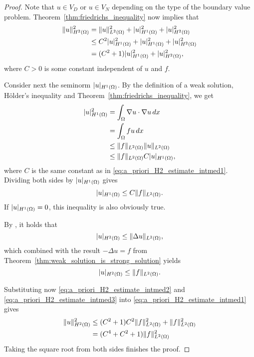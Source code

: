 \documentclass[english, 12pt, a4paper, sci, utf8, a-2b, online]{aaltothesis}
\theoremstyle{definition}
\theoremstyle{plain}
\DeclarePairedDelimiter\abs{\lvert}{\rvert}
\DeclarePairedDelimiter\norm{\lVert}{\rVert}
\newcommand*\diff{\mathop{}\!d}
\numberwithin{equation}{section}
\begin{document}
\begin{proof}
    Note that $u \in V_D$ or $u \in V_N$ depending
    on the type of the boundary value problem.
    Theorem~\ref{thm:friedrichs_inequality} now implies that
    \begin{align}
        \norm{u}_{H^2(\Omega)}^2
        &= \norm{u}_{L^2(\Omega)}^2
            + \abs{u}_{H^1(\Omega)}^2
                + \abs{u}_{H^2(\Omega)}^2 \nonumber \\
        &\leq C^2 \abs{u}_{H^1(\Omega)}^2
            + \abs{u}_{H^1(\Omega)}^2
                + \abs{u}_{H^2(\Omega)}^2 \nonumber \\
        \label{eq:a_priori_H2_estimate_intmed1}
        &= (C^2 + 1) \abs{u}_{H^1(\Omega)}^2 + \abs{u}_{H^2(\Omega)}^2,
    \end{align}
    where $C > 0$ is some constant independent of $u$ and $f$.

    Consider next the seminorm $\abs{u}_{H^1(\Omega)}$.
    By the definition of a weak solution, Hölder's inequality
    and Theorem~\ref{thm:friedrichs_inequality}, we get
    \begin{align*}
        \abs{u}_{H^1(\Omega)}^2
        &= \int_{\Omega} \nabla u \cdot \nabla u \diff x \\
        &= \int_{\Omega} f u \diff x \\
        &\leq \norm{f}_{L^2(\Omega)} \norm{u}_{L^2(\Omega)} \\
        &\leq \norm{f}_{L^2(\Omega)} C \abs{u}_{H^1(\Omega)},
    \end{align*}
    where $C$ is the same constant as in \eqref{eq:a_priori_H2_estimate_intmed1}.
    Dividing both sides by $\abs{u}_{H^1(\Omega)}$ gives
    \begin{equation}
        \label{eq:a_priori_H2_estimate_intmed2}
        \abs{u}_{H^1(\Omega)} \leq C \norm{f}_{L^2(\Omega)}.
    \end{equation}
    If $\abs{u}_{H^1(\Omega)} = 0$, this inequality is also obviously true.

    By \cite[Proof of Theorem 4.3.1.4 on p.~199]{grisvard2011}, it holds that
    \begin{equation*}
        \abs{u}_{H^2(\Omega)} \leq \norm{\Delta u}_{L^2(\Omega)},
    \end{equation*}
    which combined with the result $-\Delta u = f$ from
    Theorem~\ref{thm:weak_solution_is_strong_solution} yields
    \begin{equation}
        \label{eq:a_priori_H2_estimate_intmed3}
        \abs{u}_{H^2(\Omega)} \leq \norm{f}_{L^2(\Omega)}.
    \end{equation}

    Substituting now \eqref{eq:a_priori_H2_estimate_intmed2}
    and \eqref{eq:a_priori_H2_estimate_intmed3}
    into \eqref{eq:a_priori_H2_estimate_intmed1} gives
    \begin{align*}
        \norm{u}_{H^2(\Omega)}^2
        &\leq (C^2+1) C^2 \norm{f}_{L^2(\Omega)}^2 + \norm{f}_{L^2(\Omega)}^2 \\
        &= (C^4 + C^2 + 1) \norm{f}_{L^2(\Omega)}^2
    \end{align*}
    Taking the square root from both sides finishes the proof.
\end{proof}
\end{document}
